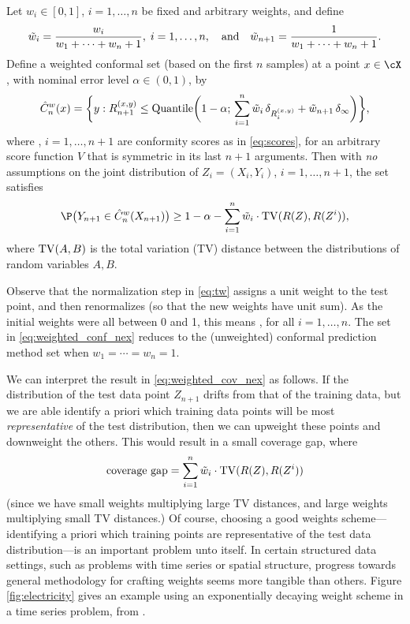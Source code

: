 \documentclass{article}
\begin{document}
\begin{theorem}
\label{thm:weighted_conf_nex}
Let $w_i \in [0,1]$, $i=1,\dots,n$ be fixed and arbitrary weights, and define 
\begin{equation}
\label{eq:tw}
\tilde{w}_i = \frac{w_i}{w_1 + \cdots + w_n + 1}, \; i=1,\ldots,n, 
\quad \text{and} \quad 
\tilde{w}_{n+1} = \frac{1}{w_1 + \cdots + w_n + 1}.
\end{equation}
Define a weighted conformal set (based on the first $n$ samples) at a point
$x \in \cX$, with nominal error level $\alpha \in (0,1)$, by   
\begin{equation}
\label{eq:weighted_conf_nex}
\hat{C}^w_n(x) = \bigg\{ y : R_{n+1}^{(x,y)} \leq \mathrm{Quantile}\bigg( 1-\alpha; 
\, \sum_{i=1}^n \tilde{w}_i \, \delta_{R_i^{(x,y)}} + \tilde{w}_{n+1} \, \delta_\infty
\bigg) \bigg\},   
\end{equation}
where , $i=1,\ldots,n+1$ are conformity scores as in
\eqref{eq:scores}, for an arbitrary score function $V$ that is symmetric in its
last $n+1$ arguments. Then with \emph{no} assumptions on the joint distribution
of $Z_i=(X_i,Y_i)$, $i=1,\dots,n+1$, the set  satisfies
\begin{equation}
\label{eq:weighted_cov_nex}
\P\big( Y_{n+1} \in \hC^w_n(X_{n+1}) \big) \geq 1-\alpha - \sum_{i=1}^n 
\tw_i \cdot \TV(R(Z), R(Z^i)),
\end{equation}
where $\mathrm{TV}(A,B)$ is the total variation (TV) distance between the distributions
of random variables $A,B$.  
\end{theorem}

Observe that the normalization step in \eqref{eq:tw} assigns a unit weight to 
the test point, and then renormalizes (so that the new weights have unit
sum). As the initial weights were all between 0 and 1, this means
, for all $i=1,\dots,n$. The set in
\eqref{eq:weighted_conf_nex} reduces to the (unweighted) conformal prediction
method set when $w_1 = \cdots = w_n = 1$.  

We can interpret the result in \eqref{eq:weighted_cov_nex} as follows. If the
distribution of the test data point $Z_{n+1}$ drifts from that of the training
data, but we are able identify a priori which training data points will be most
\emph{representative} of the test distribution, then we can upweight these
points and downweight the others. This would result in a small coverage gap, 
where  
\begin{equation}
\label{eq:coverage_gap}
\text{coverage gap} = \sum_{i=1}^n \tilde{w}_i \cdot \mathrm{TV}(R(Z), R(Z^i))
\end{equation}
(since we have small weights multiplying large TV distances, and large weights 
multiplying small TV distances.) Of course, choosing a good weights
scheme---identifying a priori which training points are representative of the
test data distribution---is an important problem unto itself. In certain
structured data settings, such as problems with time series or spatial
structure, progress towards general methodology for crafting weights seems more
tangible than others. Figure \ref{fig:electricity} gives an example using an
exponentially decaying weight scheme in a time series problem, from
\citet{barber2023conformal}.  
\end{document}
